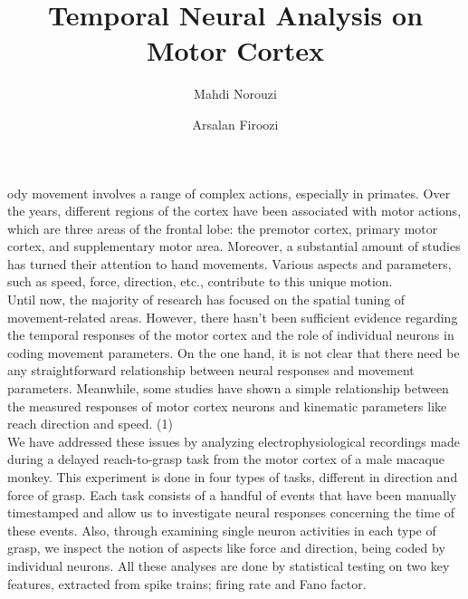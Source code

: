 \documentclass[9pt,twocolumn]{paper-template}
\title{Temporal Neural Analysis on Motor Cortex}
\author[a]{Mahdi Norouzi}
\author[a]{Arsalan Firoozi}
\affil[a]{Bachelor Student, Electrical Engineering Department, Sharif University of Technology}
\begin{document}
\maketitle
\thispagestyle{firststyle}

ody movement involves a range of complex actions, especially in primates. Over the years, different regions of the cortex have been associated with motor actions, which are three areas of the frontal lobe: the premotor cortex, primary motor cortex, and supplementary motor area. Moreover, a substantial amount of studies has turned their attention to hand movements. Various aspects and parameters, such as speed, force, direction, etc., contribute to this unique motion.
\\
Until now, the majority of research has focused on the spatial tuning of movement-related areas. However, there hasn’t been sufficient evidence regarding the temporal responses of the motor cortex and the role of individual neurons in coding movement parameters. On the one hand, it is not clear that there need be any straightforward relationship between neural responses and movement parameters. Meanwhile, some studies have shown a simple relationship between the measured responses of motor cortex neurons and kinematic parameters like reach direction and speed. (1)
\\
We have addressed these issues by analyzing electrophysiological recordings made during a delayed reach-to-grasp task from the motor cortex of a male macaque monkey. This experiment is done in four types of tasks, different in direction and force of grasp. Each task consists of a handful of events that have been manually timestamped and allow us to investigate neural responses concerning the time of these events. Also, through examining single neuron activities in each type of grasp, we inspect the notion of aspects like force and direction, being coded by individual neurons. All these analyses are done by statistical testing on two key features, extracted from spike trains; firing rate and Fano factor.
 
\end{document}
